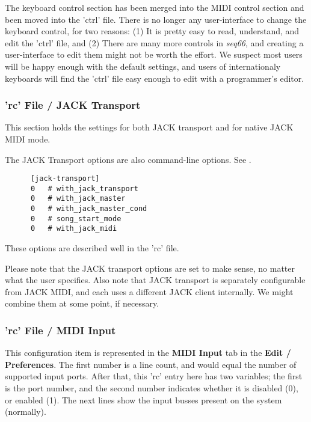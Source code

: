    The keyboard control section has been merged into the MIDI control section
   and been moved into the 'ctrl' file.
   There is no longer any user-interface to change the
   keyboard control, for two reasons:
   (1) It is pretty easy to read, understand, and edit the 'ctrl' file, and
   (2) There are many more controls in \textsl{seq66}, and creating a
   user-interface to edit them might not be worth the effort.
   We suspect most users will be happy enough with the default settings,
   and users of internationaly keyboards will find the 'ctrl' file easy enough
   to edit with a programmer's editor.
        
\subsubsection{'rc' File / JACK Transport}
\label{subsubsec:configuration_rc_jack_transport}

   This section holds the settings for both JACK transport and for native JACK
   MIDI mode.

   The JACK Transport options are also command-line options.
   See .

   \begin{verbatim}
      [jack-transport]
      0   # with_jack_transport
      0   # with_jack_master
      0   # with_jack_master_cond
      0   # song_start_mode
      0   # with_jack_midi
   \end{verbatim}

   These options are described well in the 'rc' file.

   Please note that the JACK transport options are set to make sense, no
   matter what the user specifies.
   Also note that JACK transport is separately configurable from
   JACK MIDI, and each uses a different JACK client internally.
   We might combine them at some point, if necessary.

\subsubsection{'rc' File / MIDI Input}
\label{subsubsec:configuration_rc_midi_input}

   This configuration item is represented in the
   \textbf{MIDI Input} tab in the \textbf{Edit / Preferences}.
   The first number is a line count, and would equal the number of
   supported input ports.
   After that, this 'rc' entry here has two variables;
   the first is the port number,
   and the second number indicates whether it is disabled (0), or enabled (1).
   The next lines show the input busses present on the system (normally).

